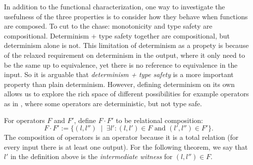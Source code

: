 In addition to the functional characterization, one way to investigate
the usefulness of the three properties is to consider how they behave when functions are composed.
To cut to the chase: monotonicity and type safety are compositional.
Determinism + type safety together are compositional, but determinism alone is not.
This limitation of determinism as a propety is because of the relaxed requirement on determinism in the output, where it only need to be the same up to equivalence, yet there is no reference to equivalence in the input.
So it is arguable that \emph{determinism + type safety} is a more important property than plain determinism. However, defining determinism on its own allows us to explore the rich space of different possibilities for example operators as in , where some operators are deterministic, but not type safe.

For operators $F$ and $F'$, define $F \cdot F'$ to be relational composition:
\[
F \cdot F' := \big\{ (l, l'') \;\mid\; \exists l': (l, l') \in F \text{ and } (l', l'') \in F' \big\}.
\]
The composition of operators is an operator because it is a total relation (for every input there is at least one output).
For the following theorem, we say that $l'$ in the definition above is the \emph{intermediate witness} for $(l, l'') \in F$.

